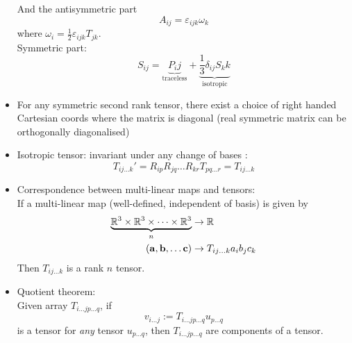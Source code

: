 \begin{itemize}
            And the antisymmetric part \[A_{ij}= \varepsilon_{ijk} \omega_k\]
            where $\omega_i = \frac{1}{2} \varepsilon_{ijk}T_{jk}$. \\
            Symmetric part: \[ S_{ij} = \underbrace{P_ij}_{\text{traceless}} + \underbrace{\frac{1}{3}\delta_{ij} S_kk}_{\text{isotropic}} \]
      \item For any symmetric second rank tensor, there exist a choice of right handed Cartesian coords where the matrix is diagonal (real symmetric matrix can be orthogonally diagonalised)
      \item Isotropic tensor: invariant under any change of bases :
            \[ T_{ij\dots k}'=R_{ip}R_{jq}\dots R_{kr} T_{pq\dots r} = T_{ij\dots k}\]
      \item Correspondence between multi-linear maps and tensors: \\
            If a multi-linear map (well-defined, independent of basis) is given by
            \begin{align*}
                  \underbrace{\R^3 \times \R^3 \times \dots \times \R^3}_n & \to \R                        \\
                  (\vec{a}, \vec{b} , \dots \vec{c})                       & \to T_{ij\dots k} a_i b_j c_k
            \end{align*}
            Then $T_{ij\dots k}$ is a rank $n$ tensor.
      \item Quotient theorem:\\
            Given array $T_{i\dots jp\dots q}$, if \[ v_{i\dots j} := T_{i\dots jp\dots q} u_{p \dots q}\] is a tensor for \emph{any} tensor $u_{p\dots q}$, then $T_{i\dots jp\dots q}$ are components of a tensor.
\end{itemize}

